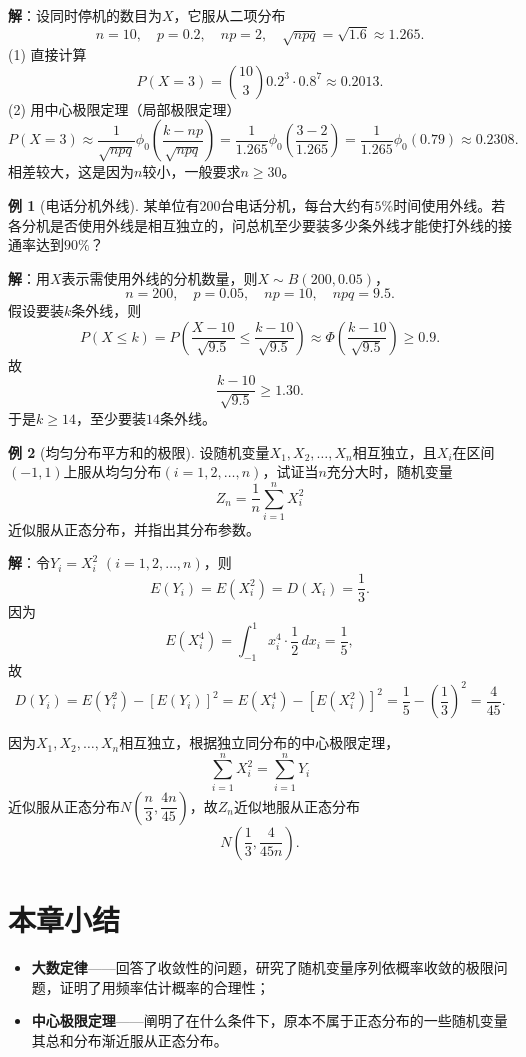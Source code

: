 \documentclass[11pt,a4paper]{report}
\theoremstyle{definition}
\newtheorem{example}{例}[chapter]
\begin{document}
\textbf{解}：设同时停机的数目为$X$，它服从二项分布
\[
n=10,\quad p=0.2,\quad np=2,\quad\sqrt{npq}=\sqrt{1.6}\approx1.265.
\]
(1) 直接计算
\[
P(X=3)=\binom{10}{3}0.2^{3}\cdot0.8^{7}\approx0.2013.
\]
(2) 用中心极限定理（局部极限定理）
\[
P(X=3)\approx\frac{1}{\sqrt{npq}}\phi_{0}\left(\frac{k-np}{\sqrt{npq}}\right)=\frac{1}{1.265}\phi_{0}\left(\frac{3-2}{1.265}\right)=\frac{1}{1.265}\phi_{0}(0.79)\approx0.2308.
\]
相差较大，这是因为$n$较小，一般要求$n\geq30$。

\begin{example}[电话分机外线]
某单位有$200$台电话分机，每台大约有$5\%$时间使用外线。若各分机是否使用外线是相互独立的，问总机至少要装多少条外线才能使打外线的接通率达到$90\%$？
\end{example}

\textbf{解}：用$X$表示需使用外线的分机数量，则$X\sim B(200,0.05)$，
\[
n=200,\quad p=0.05,\quad np=10,\quad npq=9.5.
\]
假设要装$k$条外线，则
\[
P(X\leq k)=P\left(\frac{X-10}{\sqrt{9.5}}\leq\frac{k-10}{\sqrt{9.5}}\right)\approx\Phi\left(\frac{k-10}{\sqrt{9.5}}\right)\geq0.9.
\]
故
\[
\frac{k-10}{\sqrt{9.5}}\geq1.30.
\]
于是$k\geq14$，至少要装$14$条外线。

\begin{example}[均匀分布平方和的极限]
设随机变量$X_{1},X_{2},\ldots,X_{n}$相互独立，且$X_{i}$在区间$(-1,1)$上服从均匀分布$(i=1,2,\ldots,n)$，试证当$n$充分大时，随机变量
\[
Z_{n}=\frac{1}{n}\sum_{i=1}^{n}X_{i}^{2}
\]
近似服从正态分布，并指出其分布参数。
\end{example}

\textbf{解}：令$Y_{i}=X_{i}^{2}$ $(i=1,2,\ldots,n)$，则
\[
E(Y_{i})=E(X_{i}^{2})=D(X_{i})=\frac{1}{3}.
\]
因为
\[
E(X_{i}^{4})=\int_{-1}^{1}x_{i}^{4}\cdot\frac{1}{2}\,dx_{i}=\frac{1}{5},
\]
故
\[
D(Y_{i})=E(Y_{i}^{2})-[E(Y_{i})]^{2}=E(X_{i}^{4})-[E(X_{i}^{2})]^{2}=\frac{1}{5}-\left(\frac{1}{3}\right)^{2}=\frac{4}{45}.
\]

因为$X_{1},X_{2},\ldots,X_{n}$相互独立，根据独立同分布的中心极限定理，
\[
\sum_{i=1}^{n}X_{i}^{2}=\sum_{i=1}^{n}Y_{i}
\]
近似服从正态分布$N\!\left(\dfrac{n}{3},\dfrac{4n}{45}\right)$，故$Z_{n}$近似地服从正态分布
\[
N\!\left(\frac{1}{3},\frac{4}{45n}\right).
\]

\section*{本章小结}


\begin{itemize}[leftmargin=2em]
    \item \textbf{大数定律}——回答了收敛性的问题，研究了随机变量序列依概率收敛的极限问题，证明了用频率估计概率的合理性；
    \item \textbf{中心极限定理}——阐明了在什么条件下，原本不属于正态分布的一些随机变量其总和分布渐近服从正态分布。
\end{itemize}
\end{document}
